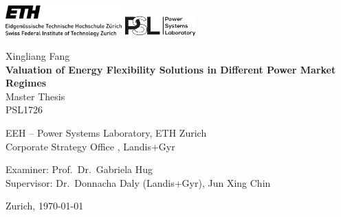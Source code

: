 \begin{titlepage}
\begin{center}

\includegraphics[height=12mm]{Figures/eth_logo_lang_pos}
\hfill
\includegraphics[height=8mm]{Figures/PSL_logo}

\vspace{30mm} Xingliang Fang \\
\vspace{10mm} \textbf{\LARGE Valuation of Energy Flexibility Solutions in Different Power Market Regimes} \\
\vspace{10mm} Master Thesis \\ PSL1726


\vfill

EEH -- Power Systems Laboratory, ETH Zurich \\
Corporate Strategy Office , Landis+Gyr

\vspace{5mm}

Examiner: Prof.~Dr.~Gabriela Hug \\
Supervisor: Dr.~Donnacha Daly (Landis+Gyr), Jun Xing Chin


\vspace{5mm} Zurich, \today

\end{center}
\end{titlepage}
